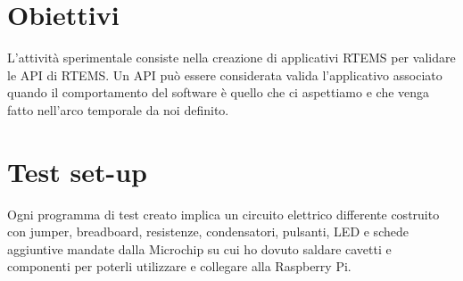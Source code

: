 \documentclass[12pt, a4paper, titlepage, oneside]{book}
\begin{document}
\begin{flushleft}
\section{Obiettivi}
L'attività sperimentale consiste nella creazione di applicativi RTEMS per validare le API di RTEMS. Un API può essere considerata valida l'applicativo associato quando il comportamento del software è quello che ci aspettiamo e che venga fatto nell'arco temporale da noi definito.\\

\section{Test set-up}
Ogni programma di test creato implica un circuito elettrico differente costruito con jumper, breadboard, resistenze, condensatori, pulsanti, LED e schede aggiuntive mandate dalla Microchip su cui ho dovuto saldare cavetti e componenti per poterli utilizzare e collegare alla Raspberry Pi.\\


\end{flushleft}
\end{document}
